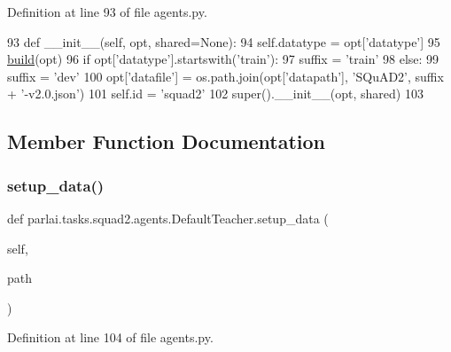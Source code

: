 Definition at line 93 of file agents.\+py.


\begin{DoxyCode}
93     \textcolor{keyword}{def }\_\_init\_\_(self, opt, shared=None):
94         self.datatype = opt[\textcolor{stringliteral}{'datatype'}]
95         \hyperlink{namespaceparlai_1_1mturk_1_1tasks_1_1talkthewalk_1_1download_a8c0fbb9b6dfe127cb8c1bd6e7c4e33fd}{build}(opt)
96         \textcolor{keywordflow}{if} opt[\textcolor{stringliteral}{'datatype'}].startswith(\textcolor{stringliteral}{'train'}):
97             suffix = \textcolor{stringliteral}{'train'}
98         \textcolor{keywordflow}{else}:
99             suffix = \textcolor{stringliteral}{'dev'}
100         opt[\textcolor{stringliteral}{'datafile'}] = os.path.join(opt[\textcolor{stringliteral}{'datapath'}], \textcolor{stringliteral}{'SQuAD2'}, suffix + \textcolor{stringliteral}{'-v2.0.json'})
101         self.id = \textcolor{stringliteral}{'squad2'}
102         super().\_\_init\_\_(opt, shared)
103 
\end{DoxyCode}


\subsection{Member Function Documentation}
\mbox{\label{classparlai_1_1tasks_1_1squad2_1_1agents_1_1DefaultTeacher_a68185506bbbcaadaee2dbf5162483437}} 
\subsubsection{\texorpdfstring{setup\+\_\+data()}{setup\_data()}}
{\footnotesize\ttfamily def parlai.\+tasks.\+squad2.\+agents.\+Default\+Teacher.\+setup\+\_\+data (\begin{DoxyParamCaption}\item[{}]{self,  }\item[{}]{path }\end{DoxyParamCaption})}



Definition at line 104 of file agents.\+py.


